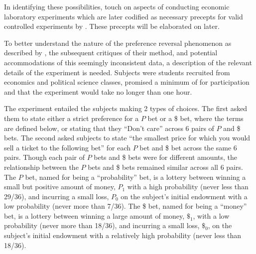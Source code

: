 \documentclass[../main.tex]{subfiles}
\begin{document}
In identifying these possibilities, \textcite{Grether1979} touch on aspects of conducting economic laboratory experiments which are later codified as necessary precepts for valid controlled experiments by \textcite{Smith1982}.{\footnotemark} 
These precepts will be elaborated on later.

\addtocounter{footnote}{-1}

To better understand the nature of the preference reversal phenomenon as described by \textcite{Grether1979}, the subsequent critiques of their method, and potential accommodations of this seemingly inconsistent data, a description of the relevant details of the experiment is needed.
Subjects were students recruited from economics and political science classes, promised a minimum of  for participation and that the experiment would take no longer than one hour.

The experiment entailed the subjects making 2 types of choices.
The first asked them to state either a strict preference for a $P$ bet or a \$ bet, where the terms are defined below, or stating that they \enquote{Don't care} across 6 pairs of $P$ and \$ bets.
The second asked subjects to state \enquote{the smallest price for which you would sell a ticket to the following bet} \parencite*[630]{Grether1979} for each $P$ bet and \$ bet across the same 6 pairs.
Though each pair of $P$ bets and \$ bets were for different amounts, the relationship between the $P$ bets and \$ bets remained similar across all 6 pairs.
The $P$ bet, named for being a \enquote{probability} bet, is a lottery between winning a small but positive amount of money, $P_1$ with a high probability (never less than 29/36), and incurring a small loss, $P_0$ on the subject's initial endowment with a low probability (never more than 7/36).
The \$ bet, named for being a \enquote{money} bet, is a lottery between winning a large amount of money, $\$_1$, with a low probability (never more than 18/36), and incurring a small loss, $\$_0$, on the subject's initial endowment with a relatively high probability (never less than 18/36).
\end{document}
